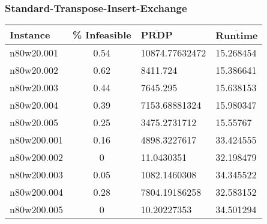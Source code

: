 \begin{homeworkProblem}
\begin{center}
\begin{tabular}{|l|c|l|l|}
\end{tabular}
\end{center}

\subsubsection{Standard-Transpose-Insert-Exchange}
\begin{center}
\begin{tabular}{|l|c|l|l|}
\hline
\textbf{Instance}& \textbf{\% Infeasible} & $\mathbf{\bar{PRDP}}$ &$\mathbf{\bar{Runtime}}$\\
\hline
n80w20.001&0.54&10874.77632472&15.268454\\
\hline
n80w20.002&0.62&8411.724&15.386641\\
\hline
n80w20.003&0.44&7645.295&15.638153\\
\hline
n80w20.004&0.39&7153.68881324&15.980347\\
\hline
n80w20.005&0.25&3475.2731712&15.55767\\
\hline
n80w200.001&0.16&4898.3227617&33.424555\\
\hline
n80w200.002&0&11.0430351&32.198479\\
\hline
n80w200.003&0.05&1082.1460308&34.345522\\
\hline
n80w200.004&0.28&7804.19186258&32.583152\\
\hline
n80w200.005&0&10.20227353&34.501294\\
\hline


\end{tabular}
\end{center}


\end{homeworkProblem}
